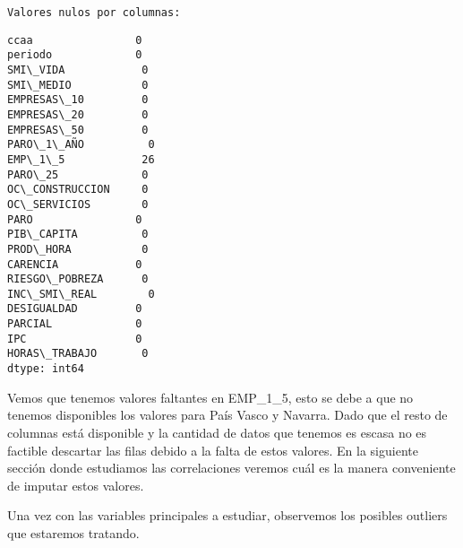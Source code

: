 \documentclass[11pt]{article}
\begin{document}
    \begin{Verbatim}[commandchars=\\\{\}]
Valores nulos por columnas:
    \end{Verbatim}

    
    \begin{Verbatim}[commandchars=\\\{\}]
ccaa                0
periodo             0
SMI\_VIDA            0
SMI\_MEDIO           0
EMPRESAS\_10         0
EMPRESAS\_20         0
EMPRESAS\_50         0
PARO\_1\_AÑO          0
EMP\_1\_5            26
PARO\_25             0
OC\_CONSTRUCCION     0
OC\_SERVICIOS        0
PARO                0
PIB\_CAPITA          0
PROD\_HORA           0
CARENCIA            0
RIESGO\_POBREZA      0
INC\_SMI\_REAL        0
DESIGUALDAD         0
PARCIAL             0
IPC                 0
HORAS\_TRABAJO       0
dtype: int64
    \end{Verbatim}

    
    Vemos que tenemos valores faltantes en EMP\_1\_5, esto se debe a que no
tenemos disponibles los valores para País Vasco y Navarra. Dado que el
resto de columnas está disponible y la cantidad de datos que tenemos es
escasa no es factible descartar las filas debido a la falta de estos
valores. En la siguiente sección donde estudiamos las correlaciones
veremos cuál es la manera conveniente de imputar estos valores.

Una vez con las variables principales a estudiar, observemos los
posibles outliers que estaremos tratando.
\end{document}
